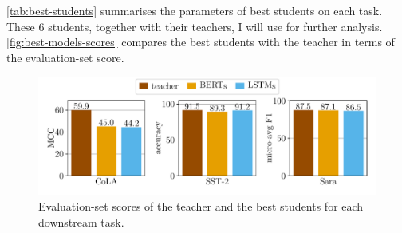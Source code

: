\documentclass[bsc,frontabs,twoside,singlespacing,parskip,deptreport]{infthesis}
\begin{document}
{{    \autoref{tab:best-students} summarises the parameters of best students on each task. These 6 students, together with their teachers, I will use for further analysis. \autoref{fig:best-models-scores} compares the best students with the teacher in terms of the evaluation-set score.

    \begin{figure}[h!tb]
      \centering
      \includegraphics[width=13cm]{../experiments/analysis/img/best-models-scores.pdf}
      \caption{Evaluation-set scores of the teacher and the best students for each downstream task.}
      \label{fig:best-models-scores}
    \end{figure}
  }
}
\end{document}
